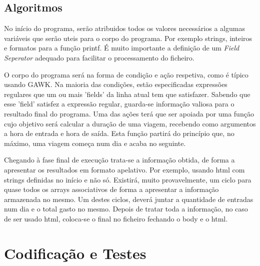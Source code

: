 \documentclass{report}
\def\fs{\emph{Field Seperator}\xspace}
\begin{document}
\section{Algoritmos}
No início do programa, serão atribuidos todos os valores necessários a algumas variáveis que serão uteis para o corpo do programa.
Por exemplo strings, inteiros e formatos para a função printf.
É muito importante a definição de um \fs adequado para facilitar o processamento do ficheiro.\par
O corpo do programa será na forma de condição e ação respetiva, como é típico usando GAWK. 
Na maioria das condições, estão especificadas expressões regulares que um ou mais 'fields' da linha atual tem que satisfazer. 
Sabendo que esse 'field' satisfez a expressão regular, guarda-se informação valiosa para o resultado final do programa. Uma das ações terá que ser apoiada por uma
função cujo objetivo será calcular a duração de uma viagem, recebendo como
argumentos a hora de entrada e hora de saída. Esta função partirá do 
princípio que, no máximo, uma viagem começa num dia e acaba no seguinte.\par
Chegando à fase final de execução trata-se a informação obtida, de forma a apresentar os resultados em formato apelativo. Por exemplo, usando html com strings definidas no início e não só. Existirá, muito provavelmente, 
um ciclo para quase todos os arrays associativos de forma a apresentar a informação 
armazenada no mesmo. Um destes ciclos, deverá juntar a quantidade de entradas num dia e o total gasto no mesmo.
Depois de tratar toda a informação, no caso de ser usado html, coloca-se o final no ficheiro fechando o body e o html. 

\chapter{Codificação e Testes} \label{ct}
\end{document}
